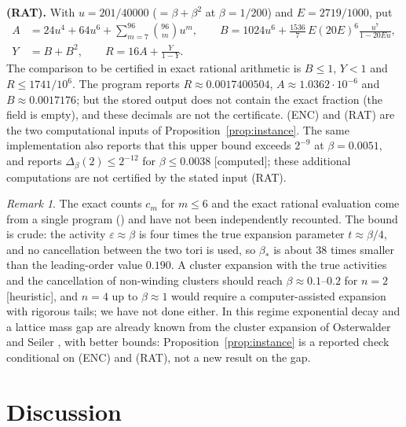 \documentclass[11pt,a4paper]{article}
\theoremstyle{plain}
\theoremstyle{definition}
\theoremstyle{remark}
\newtheorem{remark}[theorem]{Remark}
\numberwithin{equation}{section}
\newcommand{\st}[1]{\textsf{[#1]}}
\newcommand{\BETARATIO}{38}
\begin{document}
\noindent\textbf{(RAT).} With $u=201/40000$ ($=\beta+\beta^2$ at $\beta=1/200$) and $E=2719/1000$, put
\begin{align*}
A&=24u^4+64u^6+\sum_{m=7}^{96}\binom{96}{m}u^m,\qquad B=1024u^6+\frac{1536}{7}\,E(20E)^6\frac{u^7}{1-20Eu},\\
Y&=B+B^2,\qquad R=16A+\frac{Y}{1-Y}.
\end{align*}
The comparison to be certified in exact rational arithmetic is $B\le1$, $Y<1$ and $R\le1741/10^6$. The program reports $R\approx0.0017400504$, $A\approx1.0362\cdot10^{-6}$ and
$B\approx0.0017176$; but the stored output does not contain the exact fraction (the field is empty), and these decimals are not the certificate. (ENC) and (RAT) are the two
computational inputs of Proposition~\ref{prop:instance}. The same implementation also reports that this upper bound exceeds $2^{-9}$ at $\beta=0.0051$, and reports $\Delta_\beta(2)\le2^{-12}$ for $\beta\le0.0038$ \st{computed}; these additional computations are not certified by the stated input (RAT).

\begin{remark}
The exact counts $c_m$ for $m\le6$ and the exact rational evaluation come from a single program () and
have not been independently recounted. The bound is crude: the activity $\varepsilon\approx\beta$ is four times the true expansion parameter $t\approx\beta/4$, and no
cancellation between the two tori is used, so $\beta_*$ is about \BETARATIO{} times smaller than the leading-order value $0.190$. A
cluster expansion with the true activities and the cancellation of non-winding clusters should reach $\beta\approx0.1$--$0.2$ for $n=2$ \st{heuristic},
and $n=4$ up to $\beta\approx1$ would require a computer-assisted expansion with rigorous tails; we have not done either. In this regime
exponential decay and a lattice mass gap are already known from the cluster expansion of Osterwalder and Seiler \cite{OS78}, with better
bounds: Proposition~\ref{prop:instance} is a reported check conditional on (ENC) and (RAT), not a new result on the gap.
\end{remark}

\section{Discussion}\label{sec:discussion}
\end{document}

